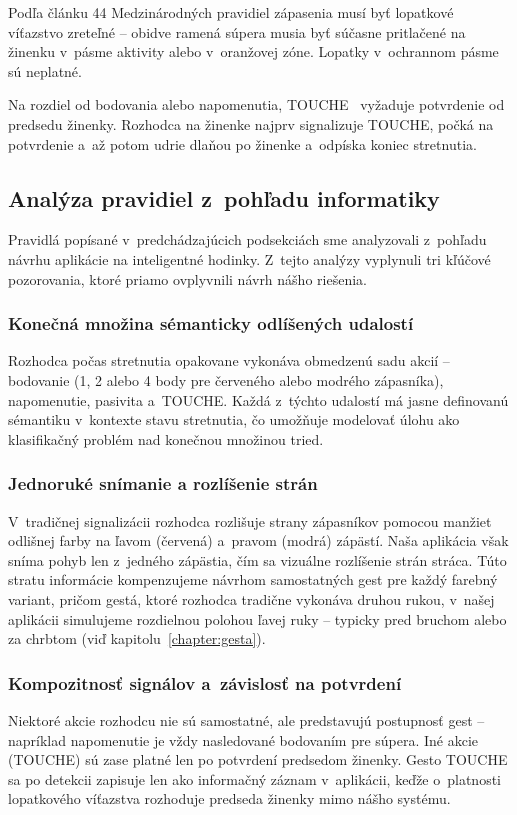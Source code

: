 Podľa článku 44 Medzinárodných pravidiel zápasenia
\cite{zapasenie_pravidla} musí byť lopatkové
víťazstvo zreteľné -- obidve ramená súpera musia
byť súčasne pritlačené na žinenku v~pásme aktivity
alebo v~oranžovej zóne. Lopatky v~ochrannom pásme
sú neplatné.

Na rozdiel od bodovania alebo napomenutia, TOUCHE~\cite{zapasenie_pravidla}
vyžaduje potvrdenie od predsedu žinenky. Rozhodca na
žinenke najprv signalizuje TOUCHE, počká na potvrdenie
a~až potom udrie dlaňou po žinenke a~odpíska koniec
stretnutia.

\subsection{Analýza pravidiel z~pohľadu informatiky}
\label{subsec:analyza-informaticka}

Pravidlá popísané v~predchádzajúcich podsekciách
sme analyzovali z~pohľadu návrhu aplikácie na
inteligentné hodinky. Z~tejto analýzy vyplynuli
tri kľúčové pozorovania, ktoré priamo ovplyvnili
návrh nášho riešenia.

\subsubsection{Konečná množina sémanticky odlíšených udalostí}
Rozhodca počas stretnutia opakovane vykonáva obmedzenú
sadu akcií -- bodovanie (1, 2 alebo 4 body pre
červeného alebo modrého zápasníka), napomenutie,
pasivita a~TOUCHE. Každá z~týchto udalostí má jasne
definovanú sémantiku v~kontexte stavu stretnutia, čo
umožňuje modelovať úlohu ako klasifikačný problém
nad konečnou množinou tried.

\subsubsection{Jednoruké snímanie a rozlíšenie strán}
V~tradičnej signalizácii rozhodca rozlišuje strany
zápasníkov pomocou manžiet odlišnej farby na ľavom
(červená) a~pravom (modrá) zápästí. Naša aplikácia
však sníma pohyb len z~jedného zápästia, čím sa
vizuálne rozlíšenie strán stráca. Túto stratu
informácie kompenzujeme návrhom samostatných gest
pre každý farebný variant, pričom gestá, ktoré
rozhodca tradične vykonáva druhou rukou,
v~našej aplikácii simulujeme rozdielnou polohou
ľavej ruky -- typicky pred bruchom alebo za chrbtom
(viď kapitolu~\ref{chapter:gesta}).

\subsubsection{Kompozitnosť signálov a~závislosť na potvrdení}
Niektoré akcie rozhodcu nie sú samostatné, ale
predstavujú postupnosť gest -- napríklad napomenutie
je vždy nasledované bodovaním pre súpera. Iné akcie
(TOUCHE) sú zase platné len po potvrdení predsedom
žinenky. Gesto TOUCHE sa po detekcii zapisuje len
ako informačný záznam v~aplikácii, keďže o~platnosti
lopatkového víťazstva rozhoduje predseda žinenky
mimo nášho systému.
